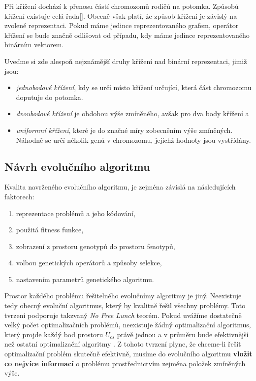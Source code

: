 Při křížení dochází k přenosu částí chromozomů rodičů na potomka. Způsobů křížení
existuje celá řada[]. Obecně však platí, že způsob křížení je závislý na zvolené 
reprezentaci. Pokud máme jedince reprezentovaného grafem, operátor křížení 
se bude značně odlišovat od případu, kdy máme jedince reprezentovaného binárním
vektorem. 

Uveďme si zde alespoň nejznámější druhy křížení nad binární reprezentaci, jimiž jsou:
\begin{itemize}
	\item \textit{jednobodové křížení}, kdy se určí místo křížení určující,
		která část chromozomu doputuje do potomka.
		
	\item \textit{dvoubodové křížení} je obdobou výše zmíněného, avšak pro dva body
		křížení a
	\item \textit{uniformní křížení}, které je do značné míry zobecněním výše zmíněných.
		 Náhodně se určí několik genů v chromozomu, jejichž hodnoty jsou vystřídány.
\end{itemize}

\subsection{Návrh evolučního algoritmu}

Kvalita navrženého evolučního algoritmu, je zejména závislá na následujících faktorech:
\begin{enumerate}
	\item reprezentace problémů a jeho kódování,
	\item použitá fitness funkce,
	\item zobrazení z prostoru genotypů do prostoru fenotypů,
	\item volbou genetických operátorů a způsoby selekce,
	\item nastavením parametrů genetického algoritmu.
\end{enumerate}

Prostor každého problému řešitelného evolučnímy algoritmy je jiný. Neexistuje tedy obecný
evoluční algoritmus, který by kvalitně řešil všechny problémy. Toto tvrzení podporuje takzvaný
\textit{No Free Lunch} teorém. Pokud uvážíme dostatečně velký počet optimalizačních problémů,
neexistuje žádný optimalizační algoritmus, který projde každý bod prostoru $U_{cs}$ právě jednou
a v průměru bude efektivnější než ostatní optimalizační algoritmy \cite{nflteorem, evolution_hardware}. 
Z tohoto tvrzení plyne, že chceme-li řešit optimalizační problém skutečně efektivně, musíme 
do evolučního algoritmu \textbf{vložit co nejvíce informací} o problému prostřednictvím 
zejména položek zmíněných výše.

